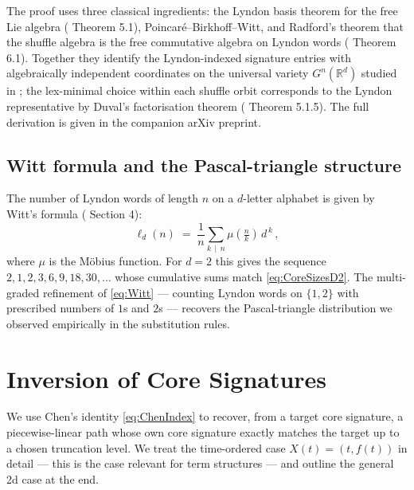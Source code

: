 \documentclass[11pt,english]{article}
\begin{document}
The proof uses three classical ingredients: the Lyndon basis theorem
for the free Lie algebra (\cite{Reutenauer} Theorem 5.1), Poincaré--Birkhoff--Witt,
and Radford's theorem that the shuffle algebra is the free commutative
algebra on Lyndon words (\cite{Reutenauer} Theorem 6.1). Together
they identify the Lyndon-indexed signature entries with algebraically
independent coordinates on the universal variety $G^{n}(\mathbb{R}^{d})$
studied in \cite{varieties}; the lex-minimal choice within each shuffle
orbit corresponds to the Lyndon representative by Duval's factorisation
theorem (\cite{Reutenauer} Theorem 5.1.5). The full derivation is
given in the companion arXiv preprint.

\subsection{Witt formula and the Pascal-triangle structure}

The number of Lyndon words of length $n$ on a $d$-letter alphabet
is given by Witt's formula (\cite{Reutenauer} Section 4):
\begin{equation}
\ell_{d}(n)\;=\;\frac{1}{n}\sum_{k\,\mid\,n}\mu\!\left(\tfrac{n}{k}\right)\,d^{\,k}\,,\label{eq:Witt}
\end{equation}
where $\mu$ is the Möbius function. For $d=2$ this gives the sequence
$2,1,2,3,6,9,18,30,\ldots$ whose cumulative sums match \eqref{eq:CoreSizesD2}.
The multi-graded refinement of \eqref{eq:Witt} --- counting Lyndon
words on $\{1,2\}$ with prescribed numbers of $1$s and $2$s --- recovers
the Pascal-triangle distribution we observed empirically in the substitution
rules.

\section{Inversion of Core Signatures\label{sec:Inversion}}

We use Chen's identity \eqref{eq:ChenIndex} to recover, from a target
core signature, a piecewise-linear path whose own core signature exactly
matches the target up to a chosen truncation level. We treat the time-ordered
case $X(t)=(t,f(t))$ in detail --- this is the case relevant for
term structures --- and outline the general 2d case at the end.
\end{document}
